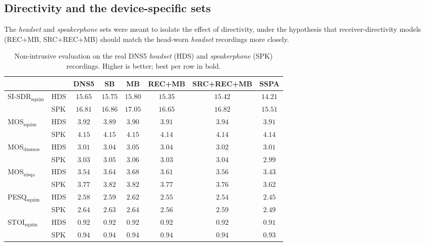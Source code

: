 \subsection{Directivity and the device-specific sets}
\label{ssec:mbrirs_res_dir}

The \emph{headset} and \emph{speakerphone} sets were meant to isolate the effect
of directivity, under the hypothesis that receiver-directivity models
(REC+MB, SRC+REC+MB) should match the head-worn \emph{headset} recordings more
closely.

\begin{table}[t]
\centering
\footnotesize
\setlength{\tabcolsep}{4pt}
\renewcommand{\arraystretch}{1.2}
\caption{Non-intrusive evaluation on the real \acrshort{DNS}5 \emph{headset}
(HDS) and \emph{speakerphone} (SPK) recordings. Higher is better; best per row
in bold.}
\label{tab:mbrirs_res_spk}
\begin{tabular}{@{}llcccccc@{}}
\toprule
 & & DNS5 & SB & MB & REC+MB & SRC+REC+MB & SSPA \\
\midrule
\multirow{2}{*}{SI-SDR$_{\text{squim}}$} & HDS & $15.65$ & $15.75$ & $\mathbf{15.80}$ & $15.35$ & $15.42$ & $14.21$ \\
                                         & SPK & $16.81$ & $16.86$ & $\mathbf{17.05}$ & $16.65$ & $16.82$ & $15.51$ \\[2pt]
\multirow{2}{*}{MOS$_{\text{squim}}$}    & HDS & $3.92$ & $3.89$ & $3.90$ & $3.91$ & $\mathbf{3.94}$ & $3.91$ \\
                                         & SPK & $\mathbf{4.15}$ & $\mathbf{4.15}$ & $\mathbf{4.15}$ & $4.14$ & $4.14$ & $4.14$ \\[2pt]
\multirow{2}{*}{MOS$_{\text{dnsmos}}$}   & HDS & $3.01$ & $3.04$ & $\mathbf{3.05}$ & $3.04$ & $3.02$ & $3.01$ \\
                                         & SPK & $3.03$ & $3.05$ & $\mathbf{3.06}$ & $3.03$ & $3.04$ & $2.99$ \\[2pt]
\multirow{2}{*}{MOS$_{\text{nisqa}}$}    & HDS & $3.54$ & $3.64$ & $\mathbf{3.68}$ & $3.61$ & $3.56$ & $3.43$ \\
                                         & SPK & $3.77$ & $3.82$ & $\mathbf{3.82}$ & $3.77$ & $3.76$ & $3.62$ \\[2pt]
\multirow{2}{*}{PESQ$_{\text{squim}}$}   & HDS & $2.58$ & $2.59$ & $\mathbf{2.62}$ & $2.55$ & $2.54$ & $2.45$ \\
                                         & SPK & $2.64$ & $2.63$ & $\mathbf{2.64}$ & $2.56$ & $2.59$ & $2.49$ \\[2pt]
\multirow{2}{*}{STOI$_{\text{squim}}$}   & HDS & $0.92$ & $0.92$ & $0.92$ & $0.92$ & $0.92$ & $0.91$ \\
                                         & SPK & $0.94$ & $0.94$ & $0.94$ & $0.94$ & $0.94$ & $0.93$ \\
\bottomrule
\end{tabular}
\end{table}


